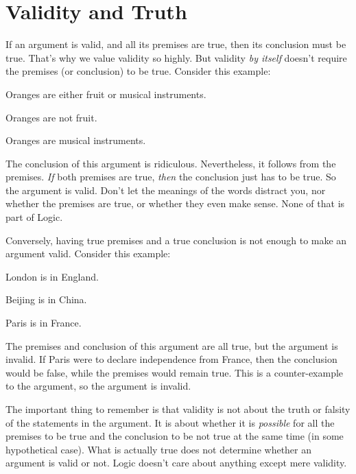 \documentclass[PHIL101-Textbook.tex]{subfiles}
\begin{document}
\medskip

\pagebreak
\section{Validity and Truth}

If an argument is valid, and all its premises are true, then its conclusion must be true. That's why we value validity so highly. But validity \emph{by itself} doesn't require the premises (or conclusion) to be true. 
Consider this example:
	\begin{earg}
		\item[] Oranges are either fruit or musical instruments.
		\item[] Oranges are not fruit.
		\item[\therefore] Oranges are musical instruments.
	\end{earg}
The conclusion of this argument is ridiculous. Nevertheless, it follows from the premises. \emph{If} both premises are true, \emph{then} the conclusion just has to be true. So the argument is valid. Don't let the meanings of the words distract you, nor whether the premises are true, or whether they even make sense. None of that is part of Logic.

Conversely, having true premises and a true conclusion is not enough to make an argument valid. Consider this example:
	\begin{earg}
		\item[] London is in England.
		\item[] Beijing is in China.
		\item[\therefore] Paris is in France.
	\end{earg}
The premises and conclusion of this argument are all true, but the argument is invalid. If Paris were to declare independence from France, then the conclusion would be false, while the premises would remain true. This is a counter-example to the argument, so the argument is invalid.

The important thing to remember is that validity is not about the truth or falsity of the statements in the argument. It is about whether it is \emph{possible} for all the premises to be true and the conclusion to be not true at the same time (in some hypothetical case). What is actually true does not determine whether an argument is valid or not.  Logic doesn't care about anything except mere validity.
\end{document}
